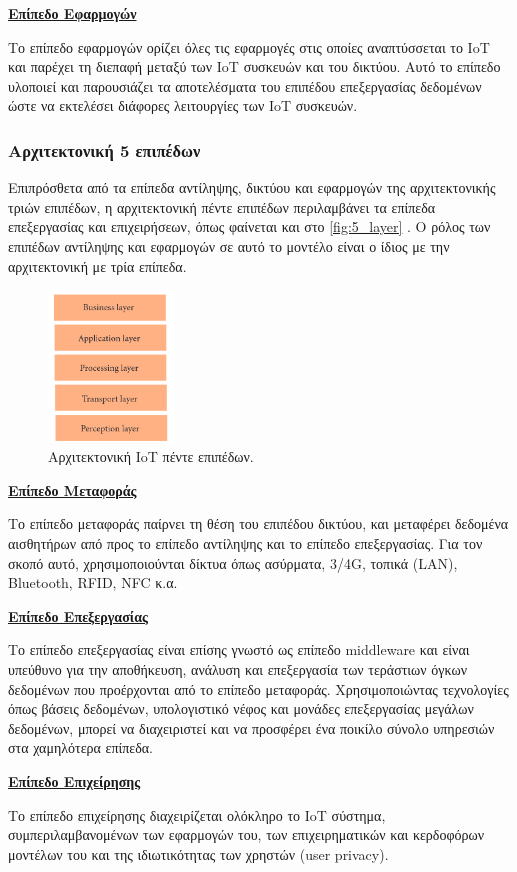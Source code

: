 \textbf{\underline{Επίπεδο Εφαρμογών}}

Το επίπεδο εφαρμογών ορίζει όλες τις εφαρμογές στις οποίες αναπτύσσεται το IoT και παρέχει τη διεπαφή μεταξύ των IoT συσκευών και του δικτύου. Αυτό το επίπεδο υλοποιεί και παρουσιάζει τα αποτελέσματα του επιπέδου επεξεργασίας δεδομένων ώστε να εκτελέσει διάφορες λειτουργίες των IoT συσκευών.

\subsubsection{Αρχιτεκτονική 5 επιπέδων}
\label{subsubsec:5_layer}

Επιπρόσθετα από τα επίπεδα αντίληψης, δικτύου και εφαρμογών της αρχιτεκτονικής τριών επιπέδων, η αρχιτεκτονική πέντε επιπέδων περιλαμβάνει τα επίπεδα επεξεργασίας και επιχειρήσεων, όπως φαίνεται και στο \autoref{fig:5_layer} \cite{bib:sethi_2017}. Ο ρόλος των επιπέδων αντίληψης και εφαρμογών σε αυτό το μοντέλο είναι ο ίδιος με την αρχιτεκτονική με τρία επίπεδα.

\begin{figure}[!ht]
	\centering
	\includegraphics[width=0.3\textwidth]{./images/chapter3/5_layer.png}
	\caption{Αρχιτεκτονική IoT πέντε επιπέδων.}
	\label{fig:5_layer}
\end{figure}

\textbf{\underline{Επίπεδο Μεταφοράς}}

Το επίπεδο μεταφοράς παίρνει τη θέση του επιπέδου δικτύου, και μεταφέρει δεδομένα αισθητήρων από προς το επίπεδο αντίληψης και το επίπεδο επεξεργασίας. Για τον σκοπό αυτό, χρησιμοποιούνται δίκτυα όπως ασύρματα, 3/4G, τοπικά (LAN), Bluetooth, RFID, NFC κ.α.

\textbf{\underline{Επίπεδο Επεξεργασίας}}

Το επίπεδο επεξεργασίας είναι επίσης γνωστό ως επίπεδο middleware και είναι υπεύθυνο για την αποθήκευση, ανάλυση και επεξεργασία των τεράστιων όγκων δεδομένων που προέρχονται από το επίπεδο μεταφοράς. Χρησιμοποιώντας τεχνολογίες όπως βάσεις δεδομένων, υπολογιστικό νέφος και μονάδες επεξεργασίας μεγάλων δεδομένων, μπορεί να διαχειριστεί και να προσφέρει ένα ποικίλο σύνολο υπηρεσιών στα χαμηλότερα επίπεδα.

\textbf{\underline{Επίπεδο Επιχείρησης}}

Το επίπεδο επιχείρησης διαχειρίζεται ολόκληρο το IoT σύστημα, συμπεριλαμβανομένων των εφαρμογών του, των επιχειρηματικών και κερδοφόρων μοντέλων του και της ιδιωτικότητας των χρηστών (user privacy).